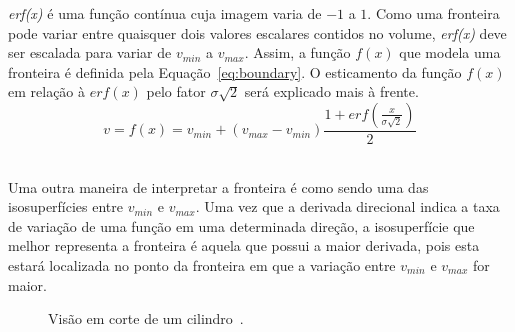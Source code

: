 	\textit{erf(x)} é uma função contínua cuja imagem varia de $-1$ a $1$. Como uma fronteira pode variar entre quaisquer dois valores escalares contidos no volume, \textit{erf(x)} deve ser escalada para variar de $v_{min}$ a $v_{max}$. Assim, a função $f(x)$ que modela uma fronteira é definida pela Equação~\eqref{eq:boundary}. O esticamento da função $ f(x) $ em relação à $ erf(x) $ pelo fator $ \sigma\sqrt{2} $ será explicado mais à frente.
	\\

\begin{equation} \label{eq:boundary}
	v = f(x) = v_{min} + (v_{max} - v_{min}) \frac{1 + erf(\frac{x}{\sigma\sqrt{2}})}{2}
\end{equation} \

	Uma outra maneira de interpretar a fronteira é como sendo uma das isosuperfícies entre $v_{min}$ e $v_{max}$. Uma vez que a derivada direcional indica a taxa de variação de uma função em uma determinada direção, a isosuperfície que melhor representa a fronteira é aquela que possui a maior derivada, pois esta estará localizada no ponto da fronteira em que a variação entre $v_{min}$ e $v_{max}$ for maior.
	
\begin{figure}[h]
	\centering
	\caption{Visão em corte de um cilindro~\cite{gordon}.}
	\label{fig:g_isosurfaces}
\end{figure}
	
